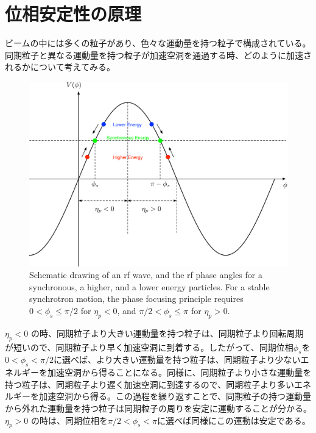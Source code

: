 \documentclass[10pt,a4paper]{ltjsarticle}
\begin{document}
\section{位相安定性の原理}
ビームの中には多くの粒子があり、色々な運動量を持つ粒子で構成されている。同期粒子と異なる運動量を持つ粒子が加速空洞を通過する時、どのように加速されるかについて考えてみる。
%
\begin{figure}[hbt]
  \begin{center}
    \includegraphics[width=15cm,clip]{phase_stability.pdf}
    \caption{Schematic drawing of an rf wave, and the rf phase angles for a synchronous, a higher, and a lower energy particles.
    For a stable synchrotron motion, the phase focusing principle requires $0 < \phi_s \leq \pi/2$ for $\eta_p < 0$,
    and $\pi/2 < \phi_s \leq \pi$ for $\eta_p > 0$.}
    \label{phase_stability}
  \end{center}
\end{figure}

$\eta_p < 0$ の時、同期粒子より大きい運動量を持つ粒子は、同期粒子より回転周期が短いので、同期粒子より早く加速空洞に到着する。したがって、同期位相$\phi_s$を$0<\phi_s<\pi/2$に選べば、より大きい運動量を持つ粒子は、同期粒子より少ないエネルギーを加速空洞から得ることになる。同様に、同期粒子より小さな運動量を持つ粒子は、同期粒子より遅く加速空洞に到達するので、同期粒子より多いエネルギーを加速空洞から得る。この過程を繰り返すことで、同期粒子の持つ運動量から外れた運動量を持つ粒子は同期粒子の周りを安定に運動することが分かる。$\eta_p > 0$ の時は、同期位相を$\pi/2<\phi_s<\pi$に選べば同様にこの運動は安定である。
\end{document}
